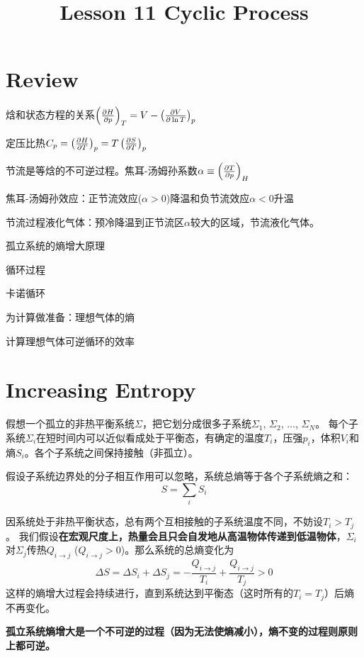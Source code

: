 \documentclass[CJK]{beamer}
\title{Lesson 11 Cyclic Process}
\author{}
\date{}
\begin{document}

\section{Review}

\begin{frame}
\bch 
\bitem
\item{焓和状态方程的关系$\left(\frac{\partial H}{\partial p}\right)_{T} = V - \left(\frac{\partial V}{\partial \ln T}\right)_{p}$}
\item{定压比热$C_p = \left(\frac{\partial H}{\partial T}\right)_{p} = T\left(\frac{\partial S}{\partial T}\right)_{p}$}
\item{节流是等焓的不可逆过程。焦耳-汤姆孙系数$\alpha \equiv \left(\frac{\partial T}{\partial p}\right)_{H}$}
\item{焦耳-汤姆孙效应：正节流效应($\alpha >0$)降温和负节流效应$\alpha<0$升温}
\item{节流过程液化气体：预冷降温到正节流区$\alpha$较大的区域，节流液化气体。}
\eitem
\ech
\end{frame}

\begin{frame}
\bch
\bitem
\item{孤立系统的熵增大原理}
\item{循环过程}
\item{卡诺循环}
\item{为计算做准备：理想气体的熵}
\item{计算理想气体可逆循环的效率}
\eitem
\ech
\end{frame}

\section{Increasing Entropy}

\begin{frame}
\bch
假想一个孤立的非热平衡系统$\Sigma$，把它划分成很多子系统$\Sigma_1$, $\Sigma_2$, $\ldots$, $\Sigma_N$。
每个子系统$\Sigma_i$在短时间内可以近似看成处于平衡态，有确定的温度$T_i$，压强$p_i$，体积$V_i$和熵$S_i$。各个子系统之间保持接触（非孤立）。

\skiplines


假设子系统边界处的分子相互作用可以忽略，系统总熵等于各个子系统熵之和：
$$S = \sum_i S_i$$
\ech
\end{frame}

\begin{frame}
\bch
因系统处于非热平衡状态，总有两个互相接触的子系统温度不同，不妨设$T_i>T_j$。
我们假设{\bf 在宏观尺度上，热量会且只会自发地从高温物体传递到低温物体}，$\Sigma_i$对$\Sigma_j$传热$Q_{i\rightarrow j}$ ($Q_{i\rightarrow j}>0$)。那么系统的总熵变化为
$$\Delta S = \Delta S_i + \Delta S_j = - \frac{Q_{i\rightarrow j}}{T_i}+ \frac{Q_{i\rightarrow j}}{T_j}  > 0$$
这样的熵增大过程会持续进行，直到系统达到平衡态（这时所有的$T_i = T_j$）后熵不再变化。

{\bf 孤立系统熵增大是一个不可逆的过程（因为无法使熵减小），熵不变的过程则原则上都可逆。}

\ech
\end{frame}
\end{document}
